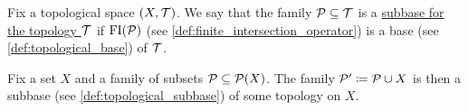 \begin{definition}\label{def:topological_subbase}
  Fix a topological space $(X, \mathcal T)$. We say that the family $\mathcal P \subseteq \mathcal T$ is a \uline{subbase for the topology $\mathcal T$} if $\operatorname{FI}(\mathcal P)$ (see \cref{def:finite_intersection_operator}) is a base (see \cref{def:topological_base}) of $\mathcal T$.
\end{definition}

\begin{proposition}
  Fix a set $X$ and a family of subsets $\mathcal P \subseteq \operatorname{\mathcal P}(X)$. The family $\mathcal P' \coloneqq \mathcal P \cup X$ is then a subbase (see \cref{def:topological_subbase}) of some topology on $X$.
\end{proposition}
